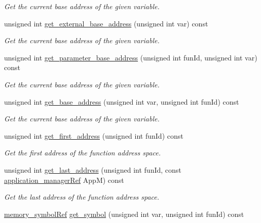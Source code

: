 \begin{DoxyCompactItemize}
\begin{DoxyCompactList}\small\item\em Get the current base address of the given variable. \end{DoxyCompactList}\item 
unsigned int \hyperlink{classmemory_a32fccfbb1ec87572fffb59d3a8a93548}{get\+\_\+external\+\_\+base\+\_\+address} (unsigned int var) const
\begin{DoxyCompactList}\small\item\em Get the current base address of the given variable. \end{DoxyCompactList}\item 
unsigned int \hyperlink{classmemory_a6488e1ee13bcf993f0406c377b4f42e4}{get\+\_\+parameter\+\_\+base\+\_\+address} (unsigned int fun\+Id, unsigned int var) const
\begin{DoxyCompactList}\small\item\em Get the current base address of the given variable. \end{DoxyCompactList}\item 
unsigned int \hyperlink{classmemory_a1ea5eb40b241fab9c4512b828223ea92}{get\+\_\+base\+\_\+address} (unsigned int var, unsigned int fun\+Id) const
\begin{DoxyCompactList}\small\item\em Get the current base address of the given variable. \end{DoxyCompactList}\item 
unsigned int \hyperlink{classmemory_a8288dc9efc8050b3d34cb06b74a1d3db}{get\+\_\+first\+\_\+address} (unsigned int fun\+Id) const
\begin{DoxyCompactList}\small\item\em Get the first address of the function address space. \end{DoxyCompactList}\item 
unsigned int \hyperlink{classmemory_a7fa2c69835e5b2deefc2b380f710b470}{get\+\_\+last\+\_\+address} (unsigned int fun\+Id, const \hyperlink{application__manager_8hpp_a04ccad4e5ee401e8934306672082c180}{application\+\_\+manager\+Ref} AppM) const
\begin{DoxyCompactList}\small\item\em Get the last address of the function address space. \end{DoxyCompactList}\item 
\hyperlink{memory__symbol_8hpp_af3608dbc27177447c2d777fa712cc82a}{memory\+\_\+symbol\+Ref} \hyperlink{classmemory_a380db560791ad488411a1d16c0526e43}{get\+\_\+symbol} (unsigned int var, unsigned int fun\+Id) const

\end{DoxyCompactItemize}
